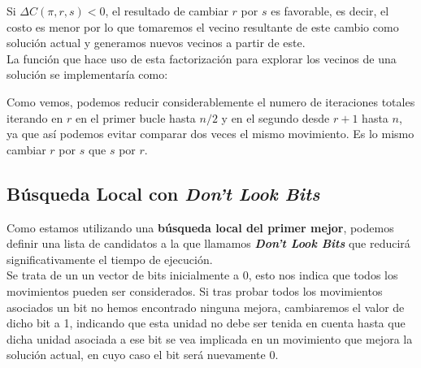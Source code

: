 \documentclass[a4paper, 12pt]{article}
\begin{document}
      Si $\Delta C(\pi,r,s) < 0$, el resultado de cambiar $r$ por $s$ es favorable, es decir, el costo es menor por lo que tomaremos el vecino resultante de este cambio como solución actual y generamos nuevos vecinos a partir de este.\\
      
      La función que hace uso de esta factorización para explorar los vecinos de una solución se implementaría como:
      \begin{algorithm}
      \end{algorithm}
      
      Como vemos, podemos reducir considerablemente el numero de iteraciones totales iterando en $r$ en el primer bucle hasta $n/2$ y en el segundo desde $r+1$ hasta $n$, ya que así podemos evitar comparar dos veces el mismo movimiento. Es lo mismo cambiar $r$ por $s$ que $s$ por $r$.
     
      
      \newpage
      \subsection*{Búsqueda Local con \textit{Don't Look Bits}}
      Como estamos utilizando una \textbf{búsqueda local del primer mejor}, podemos definir una lista de candidatos a la que llamamos \textbf{\textit{Don't Look Bits}} que reducirá significativamente el tiempo de ejecución.\\
      
      Se trata de un un vector de bits inicialmente a 0, esto nos indica que todos los movimientos pueden ser considerados. Si tras probar todos los movimientos asociados un bit no hemos encontrado ninguna mejora, cambiaremos el valor de dicho bit a 1, indicando que esta unidad no debe ser tenida en cuenta hasta que dicha unidad asociada a ese bit se vea implicada en un movimiento que mejora la solución actual, en cuyo caso el bit será nuevamente 0.\\
      
\end{document}

